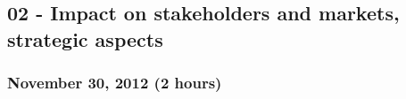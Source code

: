 \documentclass[a4paper]{article}
\begin{document}



\subsection{02 - Impact on stakeholders and markets, strategic aspects}

\subsubsection{November 30, 2012 (2 hours)}
\end{document}
